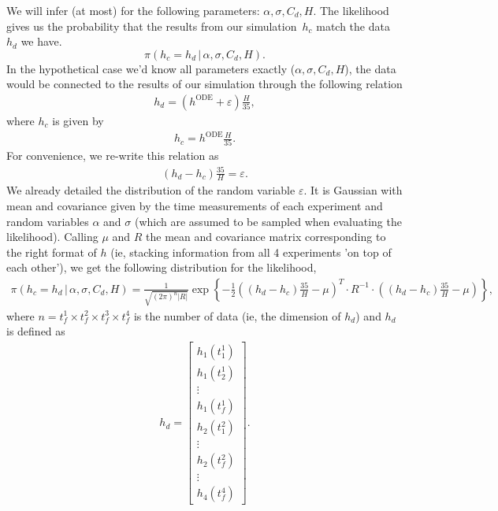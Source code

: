 \documentclass{article}
\begin{document}
We will infer (at most) for the following parameters: $\alpha, \sigma,
C_d, H$. The likelihood gives us the probability that the results from
our simulation~$h_c$ match the data~$h_d$ we have. 
\[ \pi\left( h_c = h_d \, | \, \alpha, \sigma, C_d, H \right) .\] 
In the hypothetical case we'd know all parameters exactly ($\alpha,
\sigma, C_d, H$), the data would be connected to the results of our
simulation through the following relation 
\begin{align*}
 h_d = \left( h^\text{ODE} + \varepsilon \right) \frac{H}{35} , 
\end{align*}
where $h_c$ is given by
\begin{align*}
 h_c = h^\text{ODE} \frac{H}{35}.
\end{align*}
For convenience, we re-write this relation as
\begin{align*}
\left( h_d - h_c \right)\frac{35}H  = \varepsilon.
\end{align*}
We already detailed the distribution of the random variable
$\varepsilon$. It is Gaussian with mean and covariance given by the time
measurements of each experiment and random variables $\alpha$ and
$\sigma$ (which are assumed to be sampled when evaluating the
likelihood). Calling $\mu$ and $R$ the mean and covariance matrix
corresponding to the right format of $h$ (ie, stacking information from
all 4 experiments 'on top of each other'), we get the following
distribution for the likelihood, 
\begin{align*}
 \pi(h_c = h_d \, | \, \alpha, \sigma, C_d, H) = \frac1{\sqrt{(2\pi)^n
 |R|}} \exp \left\{ - \frac12 \left( \left( h_d - h_c \right)\frac{35}H
 - \mu \right)^T \cdotp R^{-1} \cdotp \left( \left( h_d - h_c
 \right)\frac{35}H - \mu \right) \right\} , 
\end{align*}
where $n = t_f^1 \times t_f^2 \times t_f^3 \times t_f^4$ is the number
of data (ie, the dimension of $h_d$) and $h_d$ is defined as 
\begin{align*}
 h_d = \begin{bmatrix}
h_1(t_1^1) \\
h_1(t_2^1) \\
\vdots \\
h_1 (t_f^1) \\
h_2(t_1^2) \\
\vdots \\
h_2(t_f^2) \\
\vdots \\
h_4(t_f^4) 
\end{bmatrix}.
\end{align*}
\end{document}
